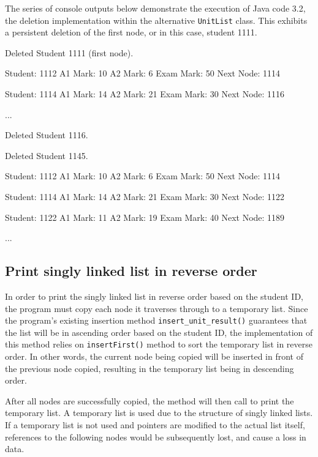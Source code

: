\newpage
\noindent
The series of console outputs below demonstrate the execution of Java code 3.2, the deletion implementation within the alternative \texttt{UnitList} class. This exhibits a persistent deletion of the first node, or in this case, student 1111.
\\
\begin{consolecode}
Deleted Student 1111 (first node).

Student: 1112
A1 Mark: 10
A2 Mark: 6
Exam Mark: 50
Next Node: 1114

Student: 1114
A1 Mark: 14
A2 Mark: 21
Exam Mark: 30
Next Node: 1116

...
\end{consolecode}

\begin{consolecode}
Deleted Student 1116.

Deleted Student 1145.

Student: 1112
A1 Mark: 10
A2 Mark: 6
Exam Mark: 50
Next Node: 1114

Student: 1114
A1 Mark: 14
A2 Mark: 21
Exam Mark: 30
Next Node: 1122

Student: 1122
A1 Mark: 11
A2 Mark: 19
Exam Mark: 40
Next Node: 1189

...
\end{consolecode}

\subsection{Print singly linked list in reverse order}

In order to print the singly linked list in reverse order based on the student ID, the program must copy each node it traverses through to a temporary list. Since the program's existing insertion method \texttt{insert_unit_result()} guarantees that the list will be in ascending order based on the student ID, the implementation of this method relies on \texttt{insertFirst()} method to sort the temporary list in reverse order. In other words, the current node being copied will be inserted in front of the previous node copied, resulting in the temporary list being in descending order.

After all nodes are successfully copied, the method will then call to print the temporary list. A temporary list is used due to the structure of singly linked lists. If a temporary list is not used and pointers are modified to the actual list itself, references to the following nodes would be subsequently lost, and cause a loss in data.


